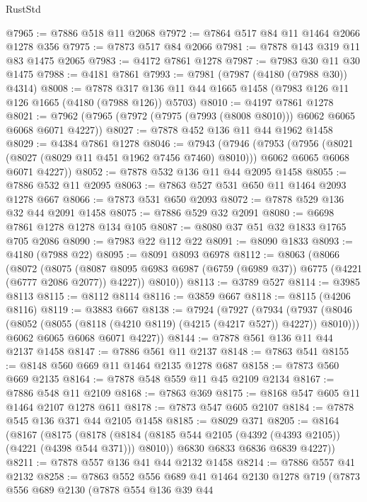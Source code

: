 \begin{lexlean}{RustStd}
\begin{coremodule}
{\begin{coremodule}
{{{{{{{{{{{{{{{{{{{{{{{{{{{{{{{@7965 := @7886 @518 @11 @2068
@7972 := @7864 @517 @84 @11 @1464 @2066 @1278 @356
@7975 := @7873 @517 @84 @2066
@7981 := @7878 @143 @319 @11 @83 @1475 @2065
@7983 := @4172 @7861 @1278
@7987 := @7983 @30 @11 @30 @1475
@7988 := @4181 @7861
@7993 := @7981 (@7987 (@4180 (@7988 @30)) @4314)
@8008 := @7878 @317 @136 @11 @44 @1665 @1458 (@7983 @126 @11 @126 @1665 (@4180 (@7988 @126)) @5703)
@8010 := @4197 @7861 @1278
@8021 := @7962 (@7965 (@7972 (@7975 (@7993 (@8008 @8010))) @6062 @6065 @6068 @6071 @4227))
@8027 := @7878 @452 @136 @11 @44 @1962 @1458
@8029 := @4384 @7861 @1278
@8046 := @7943
    (@7946
      (@7953
        (@7956 (@8021 (@8027 (@8029 @11 @451 @1962 @7456 @7460) @8010)))
        @6062
        @6065
        @6068
        @6071
        @4227))
@8052 := @7878 @532 @136 @11 @44 @2095 @1458
@8055 := @7886 @532 @11 @2095
@8063 := @7863 @527 @531 @650 @11 @1464 @2093 @1278 @667
@8066 := @7873 @531 @650 @2093
@8072 := @7878 @529 @136 @32 @44 @2091 @1458
@8075 := @7886 @529 @32 @2091
@8080 := @6698 @7861 @1278 @1278 @134 @105
@8087 := @8080 @37 @51 @32 @1833 @1765 @705 @2086
@8090 := @7983 @22 @112 @22
@8091 := @8090 @1833
@8093 := @4180 (@7988 @22)
@8095 := @8091 @8093 @6978
@8112 := @8063
    (@8066
      (@8072
        (@8075
          (@8087 @8095 @6983 @6987 (@6759 (@6989 @37)) @6775 (@4221 (@6777 @2086 @2077)) @4227))
        @8010))
@8113 := @3789 @527
@8114 := @3985 @8113
@8115 := @8112 @8114
@8116 := @3859 @667
@8118 := @8115 (@4206 @8116)
@8119 := @3883 @667
@8138 := @7924
    (@7927
      (@7934
        (@7937 (@8046 (@8052 (@8055 (@8118 (@4210 @8119) (@4215 (@4217 @527)) @4227)) @8010)))
        @6062
        @6065
        @6068
        @6071
        @4227))
@8144 := @7878 @561 @136 @11 @44 @2137 @1458
@8147 := @7886 @561 @11 @2137
@8148 := @7863 @541
@8155 := @8148 @560 @669 @11 @1464 @2135 @1278 @687
@8158 := @7873 @560 @669 @2135
@8164 := @7878 @548 @559 @11 @45 @2109 @2134
@8167 := @7886 @548 @11 @2109
@8168 := @7863 @369
@8175 := @8168 @547 @605 @11 @1464 @2107 @1278 @611
@8178 := @7873 @547 @605 @2107
@8184 := @7878 @545 @136 @371 @44 @2105 @1458
@8185 := @8029 @371
@8205 := @8164
    (@8167
      (@8175
        (@8178 (@8184 (@8185 @544 @2105 (@4392 (@4393 @2105)) (@4221 (@4398 @544 @371))) @8010))
        @6830
        @6833
        @6836
        @6839
        @4227))
@8211 := @7878 @557 @136 @41 @44 @2132 @1458
@8214 := @7886 @557 @41 @2132
@8258 := @7863
    @552
    @556
    @689
    @41
    @1464
    @2130
    @1278
    @719
    (@7873
      @556
      @689
      @2130
      (@7878
        @554
        @136
        @39
        @44
}}}}}}}}}}}}}}}}}}}}}}}}}}}}}}}
\end{coremodule}}
\end{coremodule}
\end{lexlean}
